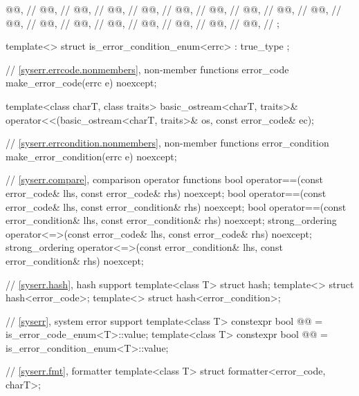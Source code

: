 \begin{codeblock}
{{    @@,              // 
    @@,                         // 
    @@,                  // 
    @@,                     // 
    @@,             // 
    @@,              // 
    @@,      // 
    @@,     // 
    @@,                // 
    @@,              // 
    @@,                     // 
    @@,                          // 
    @@,      // 
    @@,                // 
    @@,                     // 
    @@,      // 
    @@,                    // 
    @@,                // 
  };

  template<> struct is_error_condition_enum<errc> : true_type {};

  // \ref{syserr.errcode.nonmembers}, non-member functions
  error_code make_error_code(errc e) noexcept;

  template<class charT, class traits>
    basic_ostream<charT, traits>&
      operator<<(basic_ostream<charT, traits>& os, const error_code& ec);

  // \ref{syserr.errcondition.nonmembers}, non-member functions
  error_condition make_error_condition(errc e) noexcept;

  // \ref{syserr.compare}, comparison operator functions
  bool operator==(const error_code& lhs, const error_code& rhs) noexcept;
  bool operator==(const error_code& lhs, const error_condition& rhs) noexcept;
  bool operator==(const error_condition& lhs, const error_condition& rhs) noexcept;
  strong_ordering operator<=>(const error_code& lhs, const error_code& rhs) noexcept;
  strong_ordering operator<=>(const error_condition& lhs, const error_condition& rhs) noexcept;

  // \ref{syserr.hash}, hash support
  template<class T> struct hash;
  template<> struct hash<error_code>;
  template<> struct hash<error_condition>;

  // \ref{syserr}, system error support
  template<class T>
    constexpr bool @@ = is_error_code_enum<T>::value;
  template<class T>
    constexpr bool @@ = is_error_condition_enum<T>::value;

  // \ref{syserr.fmt}, formatter
  template<class T> struct formatter<error_code, charT>;
}
\end{codeblock}


